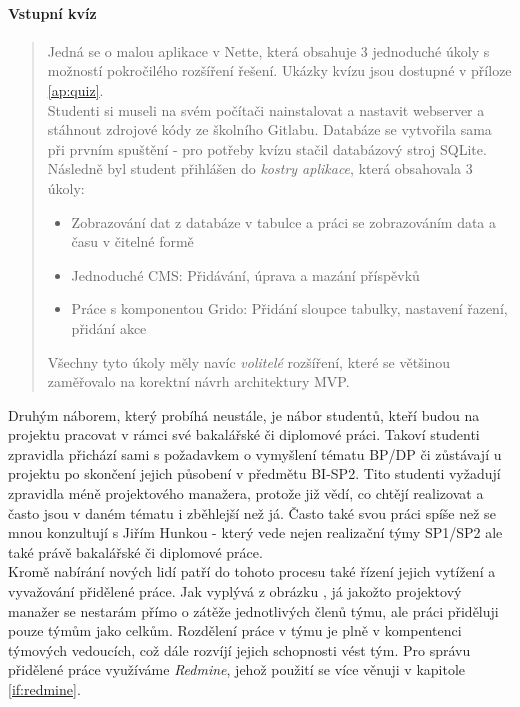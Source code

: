 \paragraph{Vstupní kvíz} \label{DBSmanagement:quiz}
\begin{quote}
Jedná se o malou aplikace v Nette, která obsahuje 3 jednoduché úkoly s možností pokročilého rozšíření řešení. Ukázky kvízu jsou dostupné v příloze \ref{ap:quiz}.\\
Studenti si museli na svém počítači nainstalovat a nastavit webserver a stáhnout zdrojové kódy ze školního Gitlabu. Databáze se vytvořila sama při prvním spuštění - pro potřeby kvízu stačil databázový stroj SQLite. Následně byl student přihlášen do \emph{kostry aplikace}, která obsahovala 3 úkoly:
\begin{itemize}
	\item Zobrazování dat z databáze v tabulce a práci se zobrazováním data a času v čitelné formě
	\item Jednoduché CMS: Přidávání, úprava a mazání příspěvků
	\item Práce s komponentou Grido: Přidání sloupce tabulky, nastavení řazení, přidání akce
\end{itemize}
Všechny tyto úkoly měly navíc \emph{volitelé} rozšíření, které se většinou zaměřovalo na korektní návrh architektury MVP. 
\end{quote}

Druhým náborem, který probíhá neustále, je nábor studentů, kteří budou na projektu pracovat v rámci své bakalářské či diplomové práci. Takoví studenti zpravidla přichází sami s požadavkem o vymyšlení tématu BP/DP či zůstávají u projektu po skončení jejich působení v předmětu BI-SP2. Tito studenti vyžadují zpravidla méně  projektového manažera, protože již vědí, co chtějí realizovat a často jsou v daném tématu i zběhlejší než já. Často také svou práci spíše než se mnou konzultují s Jiřím Hunkou - který vede nejen realizační týmy SP1/SP2 ale také právě bakalářské či diplomové práce.\\

Kromě nabírání nových lidí patří do tohoto procesu také řízení jejich vytížení a vyvažování přidělené práce. Jak vyplývá z obrázku , já jakožto projektový manažer se nestarám přímo o zátěže jednotlivých členů týmu, ale práci přiděluji pouze týmům jako celkům. Rozdělení práce v týmu je plně v kompentenci týmových vedoucích, což dále rozvíjí jejich schopnosti vést tým. Pro správu přidělené práce využíváme \emph{Redmine}, jehož použití se více věnuji v kapitole \ref{if:redmine}.


